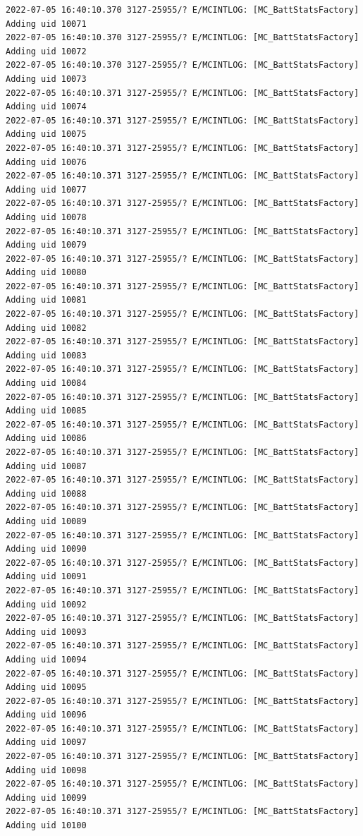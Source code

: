 \documentclass[a4paper,12pt]{book}
\begin{document}
\begin{lstlisting}
2022-07-05 16:40:10.370 3127-25955/? E/MCINTLOG: [MC_BattStatsFactory] Adding uid 10071
2022-07-05 16:40:10.370 3127-25955/? E/MCINTLOG: [MC_BattStatsFactory] Adding uid 10072
2022-07-05 16:40:10.370 3127-25955/? E/MCINTLOG: [MC_BattStatsFactory] Adding uid 10073
2022-07-05 16:40:10.371 3127-25955/? E/MCINTLOG: [MC_BattStatsFactory] Adding uid 10074
2022-07-05 16:40:10.371 3127-25955/? E/MCINTLOG: [MC_BattStatsFactory] Adding uid 10075
2022-07-05 16:40:10.371 3127-25955/? E/MCINTLOG: [MC_BattStatsFactory] Adding uid 10076
2022-07-05 16:40:10.371 3127-25955/? E/MCINTLOG: [MC_BattStatsFactory] Adding uid 10077
2022-07-05 16:40:10.371 3127-25955/? E/MCINTLOG: [MC_BattStatsFactory] Adding uid 10078
2022-07-05 16:40:10.371 3127-25955/? E/MCINTLOG: [MC_BattStatsFactory] Adding uid 10079
2022-07-05 16:40:10.371 3127-25955/? E/MCINTLOG: [MC_BattStatsFactory] Adding uid 10080
2022-07-05 16:40:10.371 3127-25955/? E/MCINTLOG: [MC_BattStatsFactory] Adding uid 10081
2022-07-05 16:40:10.371 3127-25955/? E/MCINTLOG: [MC_BattStatsFactory] Adding uid 10082
2022-07-05 16:40:10.371 3127-25955/? E/MCINTLOG: [MC_BattStatsFactory] Adding uid 10083
2022-07-05 16:40:10.371 3127-25955/? E/MCINTLOG: [MC_BattStatsFactory] Adding uid 10084
2022-07-05 16:40:10.371 3127-25955/? E/MCINTLOG: [MC_BattStatsFactory] Adding uid 10085
2022-07-05 16:40:10.371 3127-25955/? E/MCINTLOG: [MC_BattStatsFactory] Adding uid 10086
2022-07-05 16:40:10.371 3127-25955/? E/MCINTLOG: [MC_BattStatsFactory] Adding uid 10087
2022-07-05 16:40:10.371 3127-25955/? E/MCINTLOG: [MC_BattStatsFactory] Adding uid 10088
2022-07-05 16:40:10.371 3127-25955/? E/MCINTLOG: [MC_BattStatsFactory] Adding uid 10089
2022-07-05 16:40:10.371 3127-25955/? E/MCINTLOG: [MC_BattStatsFactory] Adding uid 10090
2022-07-05 16:40:10.371 3127-25955/? E/MCINTLOG: [MC_BattStatsFactory] Adding uid 10091
2022-07-05 16:40:10.371 3127-25955/? E/MCINTLOG: [MC_BattStatsFactory] Adding uid 10092
2022-07-05 16:40:10.371 3127-25955/? E/MCINTLOG: [MC_BattStatsFactory] Adding uid 10093
2022-07-05 16:40:10.371 3127-25955/? E/MCINTLOG: [MC_BattStatsFactory] Adding uid 10094
2022-07-05 16:40:10.371 3127-25955/? E/MCINTLOG: [MC_BattStatsFactory] Adding uid 10095
2022-07-05 16:40:10.371 3127-25955/? E/MCINTLOG: [MC_BattStatsFactory] Adding uid 10096
2022-07-05 16:40:10.371 3127-25955/? E/MCINTLOG: [MC_BattStatsFactory] Adding uid 10097
2022-07-05 16:40:10.371 3127-25955/? E/MCINTLOG: [MC_BattStatsFactory] Adding uid 10098
2022-07-05 16:40:10.371 3127-25955/? E/MCINTLOG: [MC_BattStatsFactory] Adding uid 10099
2022-07-05 16:40:10.371 3127-25955/? E/MCINTLOG: [MC_BattStatsFactory] Adding uid 10100

\end{lstlisting}
\end{document}

